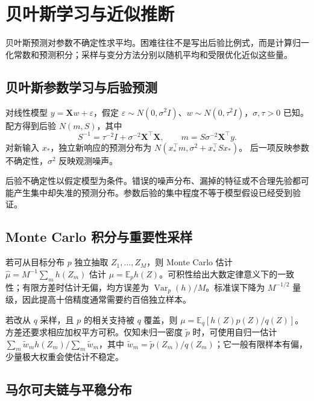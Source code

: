 \setcounter{chapter}{19} %
\chapter{贝叶斯学习与近似推断}
\label{chap:ml-bayesian}

贝叶斯预测对参数不确定性求平均。困难往往不是写出后验比例式，而是计算归一化常数和预测积分；采样与变分方法分别以随机平均和受限优化近似这些量。

\section{贝叶斯参数学习与后验预测}

对线性模型 $y=\mathbf Xw+\varepsilon$，假定 $\varepsilon\sim N(0,\sigma^2I)$、$w\sim N(0,\tau^2I)$，$\sigma,\tau>0$ 已知。配方得到后验 $N(m,S)$，其中
\begin{equation}
 S^{-1}=\tau^{-2}I+\sigma^{-2}\mathbf X^\top\mathbf X,\qquad
 m=S\sigma^{-2}\mathbf X^\top y.
 \label{eq:ml-bayesian-regression}
\end{equation}
对新输入 $x_*$，独立新响应的预测分布为
$N(x_*^\top m,\sigma^2+x_*^\top Sx_*)$。
后一项反映参数不确定性，$\sigma^2$ 反映观测噪声。

后验不确定性以假定模型为条件。错误的噪声分布、漏掉的特征或不合理先验都可能产生集中却失准的预测分布。参数后验的集中程度不等于模型假设已经受到验证。

\section{Monte Carlo 积分与重要性采样}

若可从目标分布 $p$ 独立抽取 $Z_1,\ldots,Z_M$，则 Monte Carlo 估计 $\widehat\mu=M^{-1}\sum_mh(Z_m)$ 估计 $\mu=\mathbb E_ph(Z)$。可积性给出大数定律意义下的一致性；有限方差时估计无偏，均方误差为 $\operatorname{Var}_p(h)/M$。标准误下降为 $M^{-1/2}$ 量级，因此提高十倍精度通常需要约百倍独立样本。

若改从 $q$ 采样，且 $p$ 的相关支持被 $q$ 覆盖，则 $\mu=\mathbb E_q[h(Z)p(Z)/q(Z)]$。方差还要求相应加权平方可积。仅知未归一密度 $\widetilde p$ 时，可使用自归一估计 $\sum_m\widetilde w_mh(Z_m)/\sum_m\widetilde w_m$，其中 $\widetilde w_m=\widetilde p(Z_m)/q(Z_m)$；它一般有限样本有偏，少量极大权重会使估计不稳定。

\section{马尔可夫链与平稳分布}

